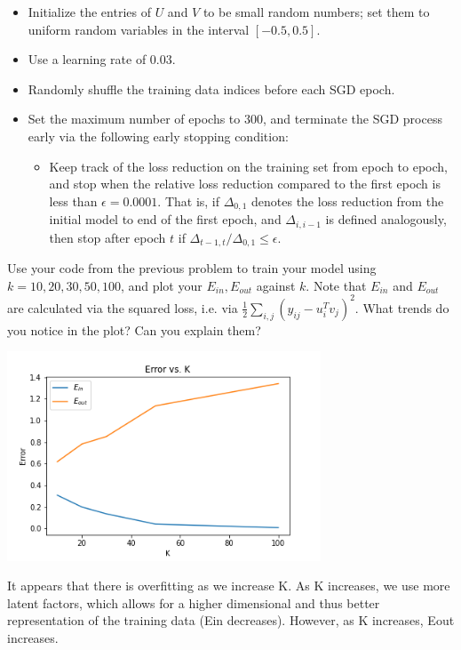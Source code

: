 \begin{itemize}
\item Initialize the entries of $U$ and $V$ to be small random numbers; set them to uniform random variables in the interval $[-0.5, 0.5]$.
\item Use a learning rate of 0.03.
\item Randomly shuffle the training data indices before each SGD epoch.
\item Set the maximum number of epochs to 300, and terminate the SGD process early via the following early stopping condition:
\begin{itemize}
\item Keep track of the loss reduction on the training set from epoch to epoch, and stop when the relative loss reduction compared to the first epoch is less than $\epsilon = 0.0001$.  That is, if $\Delta_{0,1}$ denotes the loss reduction from the initial model to end of the first epoch, and $\Delta_{i, i-1}$ is defined analogously, then stop after epoch $t$ if $\Delta_{t-1,t} / \Delta_{0,1} \leq \epsilon$.
\end{itemize}
\end{itemize}

\begin{solution}


\end{solution}

\problem[5]
Use your code from the previous problem to train your model using $k=10, 20, 30, 50, 100$, and plot your $E_{in}, E_{out}$ against $k$. Note that $E_{in}$ and $E_{out}$ are calculated via the squared loss, i.e. via $\frac{1}{2}\sum_{i,j} \left( y_{ij} - u_i^Tv_j\right)^2$. What trends do you notice in the plot? Can you explain them?

\begin{solution}
	\begin{center}
		\includegraphics[width=0.7\textwidth]{2d.png}
	\end{center}
	It appears that there is overfitting as we increase K. As K increases, we use more latent factors, which allows for a higher dimensional and thus better representation of the training data (Ein decreases). However, as K increases, Eout increases.
\end{solution}

